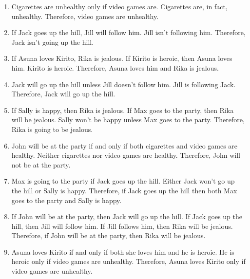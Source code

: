\begin{enumerate}
\item Cigarettes are unhealthy only if video games are. Cigarettes are, in fact, unhealthy. Therefore, video games are unhealthy.
\item If Jack goes up the hill, Jill will follow him. Jill isn't following him. Therefore, Jack isn't going up the hill.
\item If Asuna loves Kirito, Rika is jealous. If Kirito is heroic, then Asuna loves him. Kirito is heroic. Therefore, Asuna loves him and Rika is jealous. 
\item Jack will go up the hill unless Jill doesn't follow him. Jill is following Jack. Therefore, Jack will go up the hill.
\item If Sally is happy, then Rika is jealous. If Max goes to the party, then Rika will be jealous. Sally won't be happy unless Max goes to the party. Therefore, Rika is going to be jealous.
\item John will be at the party if and only if both cigarettes and video games are healthy. Neither cigarettes nor video games are healthy. Therefore, John will not be at the party. 
\item Max is going to the party if Jack goes up the hill. Either Jack won't go up the hill or Sally is happy. Therefore, if Jack goes up the hill then both Max goes to the party and Sally is happy.
\item If John will be at the party, then Jack will go up the hill. If Jack goes up the hill, then Jill will follow him. If Jill follows him, then Rika will be jealous. Therefore, if John will be at the party, then Rika will be jealous. 
\item Asuna loves Kirito if and only if both she loves him and he is heroic. He is heroic only if video games are unhealthy. Therefore, Asuna loves Kirito only if video games are unhealthy. 
\end{enumerate}

